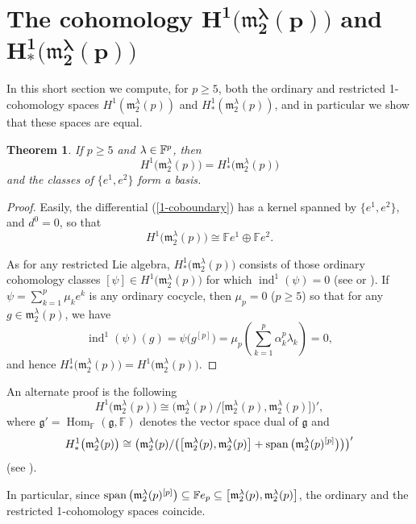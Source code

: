 \documentclass[10pt,a4paper]{amsart}
\def\spn{\mathop{\rm span}}
\def\Hom{\operatorname{Hom}}
\def\ind{\operatorname{ind}}
\def\m{\mathfrak m}
\def\F{\mathbb F}
\numberwithin{equation}{section}
\newtheorem{Theorem}{Theorem}[section]
\begin{document}
\section[The cohomology $H^1\big(\m_2^\lambda(p)\big)$ and $H^1_*\big(\m_2^\lambda(p)\big)$]{The cohomology $\boldsymbol{H^1\big(\m_2^\lambda(p)\big)}$ and $\boldsymbol{H^1_*\big(\m_2^\lambda(p)\big)}$}\label{section3}

In this short section we compute, for $p\ge 5$, both the ordinary and restricted 1-cohomology spaces $H^1(\m_2^\lambda(p))$ and $H^1_*(\m_2^\lambda(p))$, and in particular we show that these spaces are equal.

\begin{Theorem}\label{1-coho}
If $p\ge 5$ and ${\bf \lambda} \in \F^p$, then \[H^1\big(\m_2^\lambda(p)\big)=H^1_*\big(\m_2^\lambda(p)\big)\] and the classes of $\big\{e^1,e^2\big\}$ form a basis.
\end{Theorem}

\begin{proof} Easily, the differential (\ref{1-coboundary}) has a kernel spanned by $\big\{e^1,e^2\big\} $, and $d^0=0$, so that
 \[H^1\big(\m_2^\lambda(p)\big)\cong\F e^1\oplus \F e^2.\]

As for any restricted Lie algebra, $H^1_*\big(\m_2 ^\lambda (p)\big)$ consists of those ordinary cohomology classes $[\psi]\in H^1 \big(\m_2^\lambda (p)\big)$ for which $\ind^1(\psi)=0$ (see \cite[Theorem~2.1]{Hochschild1954} or \cite[Theorem~2]{EvansFuchs2008}). If $\psi =\sum_{k=1}^p \mu_ke^k$ is any ordinary cocycle, then $\mu_p=0$ ($p\ge 5$) so that for any
 $g\in \m_2^\lambda (p)$, we have
 \[\ind^1(\psi)(g)=\psi\big(g^{[p]}\big)=\mu_p\left (\sum_{k=1}^p \alpha_k^p\lambda_k\right )=0,\] and hence $H^1_*\big(\m_2^\lambda(p)\big)=H^1\big(\m_2^\lambda(p)\big)$.
\end{proof}

\begin{Remark} An alternate proof is the following
 \[
 H^1\big(\m_2^{\lambda}(p)\big)\cong \big(\m_2^{\lambda}(p)/\big[\m_2^{\lambda}(p), \m_2^{\lambda}(p)\big]\big)',
 \]
 where $\mathfrak g'=\Hom_\F(\mathfrak g,\F)$ denotes the vector space dual of $\mathfrak g$ and
 \[
 H^1_*\big(\m_2^{\lambda}(p)\big) \cong \big(\m_2^{\lambda}(p)/\big(\big[\m_2^{\lambda}(p),\m_2^{\lambda}(p)\big]+
 \spn\big(\m_2^{\lambda}(p)^{[p]}\big)\big)\big)'
 \]
 (see \cite[Proposition~2.7]{Feldvoss1991}).

In particular, since $\spn\big(\m_2^{\lambda}(p)^{[p]}\big)\subseteq \F e_p \subseteq\big[\m_2^{\lambda}(p),\m_2^{\lambda}(p)\big]$, the ordinary and the restricted 1-cohomology spaces coincide.
\end{Remark}
\end{document}

